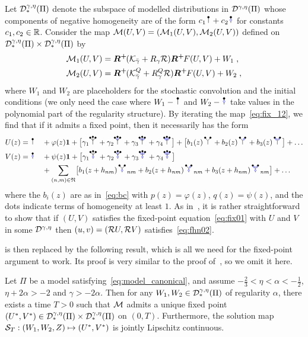 \documentclass[reqno,11pt]{article}
\def\unit{\vone}
\def\Rplus{\boldsymbol{R^+}\hspace{-.1em}}
\newcommand{\setnm}{\mathfrak{N}}
\newcommand{\sumnm}{\sum_{(n,m)\in\setnm}}
\begin{document}
Let ${\mathcal D}^{\gamma,\eta}_*(\Pi)$ denote the subspace of modelled 
distributions in ${\mathcal D}^{\gamma,\eta}(\Pi)$ whose components of negative 
homogeneity are of the form $c_1\RSI+c_2\RSoI$ for constants $c_1,c_2\in\mathbb{R}$. 
Consider the map ${\mathcal M}(U,V) = ({\mathcal M}_1(U,V),{\mathcal M}_2(U,V))$ defined on 
${\mathcal D}^{\gamma,\eta}_*(\Pi)\times{\mathcal D}^{\gamma,\eta}_*(\Pi)$ by 
\begin{align}
\nonumber
\cM_1(U,V) &= \Rplus(\cK_{\bar\gamma}+R_\gamma\cR)\Rplus F(U,V) +
W_1\;, \\
\cM_2(U,V) &= \Rplus(\cK^Q_{\bar\gamma}+R^Q_\gamma\cR)\Rplus
F(U,V) + W_2\;,
\label{eq:fix_12} 
\end{align}
where $W_1$ and $W_2$ are placeholders for the stochastic convolution and the
initial conditions (we only need the case where $W_1 - \RSI$ and $W_2 -
\RSoI$ take values in the polynomial part of the regularity structure).
By iterating the map~\eqref{eq:fix_12}, we find that if it admits a fixed point,
then it necessarily has the form 
\begin{alignat}{2}
\nonumber
U(z) ={}& \RSI &&+ \varphi(z) \unit 
+ \bigbrak{\gamma_1\!\RSIW + \gamma_2\!\RSIWo + \gamma_3\!\RSIWoo +
\gamma_4\!\RSIWooo}
+ \bigbrak{b_1(z)\RSY + b_2(z)\RSYo + b_3(z)\RSYoo} + \dots \\
\label{eq:UV_expansion} 
V(z) ={}& \RSoI &&+ \psi(z) \unit 
+ \bigbrak{\gamma_1\!\RSoIW + \gamma_2\!\RSoIWo + \gamma_3\!\RSoIWoo +
\gamma_4\!\RSoIWooo} \\
\nonumber
&&&{}+ \sumnm \bigbrak{b_1(z+h_{nm})\RSoY_{nm} + b_2(z+h_{nm})\RSoYo_{nm} +
b_3(z+h_{nm})\RSoYoo_{nm}} + \dots
\end{alignat}
where the $b_i(z)$ are as in~\eqref{eq:bc} with $p(z)=\varphi(z)$,
$q(z)=\psi(z)$, and the dots indicate terms of homogeneity at least $1$. 
As in~\cite[Prop.~5.2]{BK2016}, it is rather straightforward to show that if
$(U,V)$ satisfies the fixed-point equation~\eqref{eq:fix01} with $U$ and $V$ in
some ${\mathcal D}^{\gamma,\eta}$ then $(u,v)=({\mathcal R} U,{\mathcal R} V)$ satisfies~\eqref{eq:fhn02}. 

\cite[Prop.~5.6]{BK2016} is then replaced by the following result, which is all 
we need for the fixed-point argument to work. Its proof is very similar to the 
proof of~\cite[Prop.~5.6]{BK2016}, so we omit it here. 

\begin{prop}
Let $\Pi$ be a model satisfying~\eqref{eq:model_canonical}, and assume $-\frac23 
< \eta < \alpha < -\frac12$, $\eta+2\alpha>-2$ and $\gamma>-2\alpha$. Then for 
any $W_1,W_2\in{\mathcal D}^{\gamma,\eta}_*(\Pi)$ of regularity $\alpha$, there exists a 
time $T>0$ such that ${\mathcal M}$ admits a unique fixed point $(U^*,V^*) \in 
{\mathcal D}^{\gamma,\eta}_*(\Pi)\times{\mathcal D}^{\gamma,\eta}_*(\Pi)$ on $(0,T)$. Furthermore, 
the solution map ${\mathcal S}_T: (W_1,W_2,Z) \mapsto (U^*,V^*)$ is jointly Lipschitz 
continuous.  
\end{prop}
\end{document}
